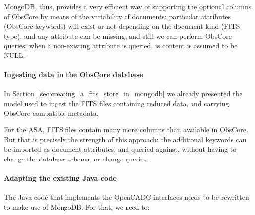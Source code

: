 MongoDB, thus, provides a very efficient way of supporting the optional columns of ObsCore by means of the variability of documents: particular attributes (ObsCore keywords) will exist or not depending on the document kind (FITS type), and any attribute can be missing, and still we can perform ObsCore queries: when a non-existing attribute is queried, is content is assumed to be NULL.


\paragraph*{Ingesting data in the ObsCore database} %
\label{par:ingesting_data_in_the_obscore_database}


In Section~\ref{sec:creating_a_fits_store_in_mongodb}
we already presented
the model used to ingest the FITS files
containing reduced data, and carrying ObsCore-compatible metadata.

For the ASA, FITS files contain many more columns than available in ObsCore. But that is precisely the strength of this approach: the additional keywords can be imported as document attributes, and queried against, without having to change the database schema, or change queries.



\paragraph*{Adapting the existing Java code} %
\label{par:adapting_the_existing_java_code}

The Java code that implements the OpenCADC interfaces needs to be rewritten to make use of MongoDB. For that, we need to:

